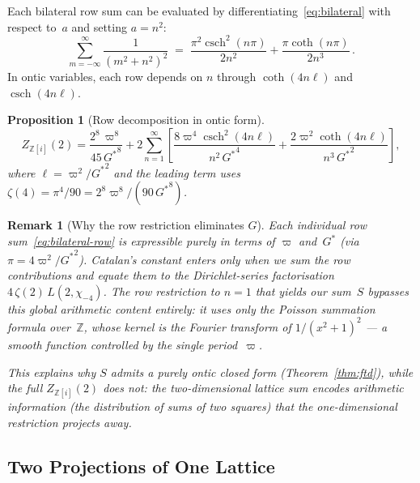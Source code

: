 \documentclass[12pt]{article}
\newtheorem{proposition}[theorem]{Proposition}
\newtheorem{remark}[theorem]{Remark}
\newcommand{\Z}{\mathbb{Z}}
\DeclareMathOperator{\csch}{csch}
\begin{document}
Each bilateral row sum can be evaluated by differentiating~\eqref{eq:bilateral}
with respect to~$a$ and setting $a=n^2$:
\begin{equation}\label{eq:bilateral-row}
\sum_{m=-\infty}^{\infty}\frac{1}{(m^2+n^2)^2}
\;=\;\frac{\pi^2\csch^2(n\pi)}{2n^2}+\frac{\pi\coth(n\pi)}{2n^3}\,.
\end{equation}
In ontic variables, each row depends on $n$ through $\coth(4n\ell)$
and $\csch(4n\ell)$.

\begin{proposition}[Row decomposition in ontic form]\label{prop:row-ontic}
\begin{equation}\label{eq:row-ontic}
Z_{\Z[i]}(2) = \frac{2^8\,\varpi^8}{45\,{G^{*}}^8}
+ 2\sum_{n=1}^{\infty}\left[
\frac{8\varpi^4\csch^2(4n\ell)}{n^2\,{G^{*}}^4}
+ \frac{2\varpi^2\coth(4n\ell)}{n^3\,{G^{*}}^2}\right],
\end{equation}
where $\ell=\varpi^2/{G^{*}}^2$ and the leading term uses
$\zeta(4)=\pi^4/90=2^8\varpi^8/(90\,{G^{*}}^8)$.
\end{proposition}

\begin{remark}[Why the row restriction eliminates $G$]\label{rem:row-kills-G}
Each individual row sum~\eqref{eq:bilateral-row} is expressible purely in
terms of $\varpi$ and~${G^{*}}$ (via $\pi=4\varpi^2/{G^{*}}^2$).  Catalan's
constant enters only when we sum the row contributions and equate them to
the Dirichlet-series factorisation $4\,\zeta(2)\,L(2,\chi_{-4})$.  The row
restriction to $n=1$ that yields our sum~$S$ bypasses this global
arithmetic content entirely: it uses only the Poisson summation formula
over~$\Z$, whose kernel is the Fourier transform of $1/(x^2+1)^2$ --- a
smooth function controlled by the single period~$\varpi$.

This explains why $S$ admits a purely ontic closed form
(Theorem~\ref{thm:ftd}), while the full $Z_{\Z[i]}(2)$ does not: the
two-dimensional lattice sum encodes arithmetic information (the
distribution of sums of two squares) that the one-dimensional restriction
projects away.
\end{remark}

\subsection{Two Projections of One Lattice}\label{sec:two-projections}
\end{document}
